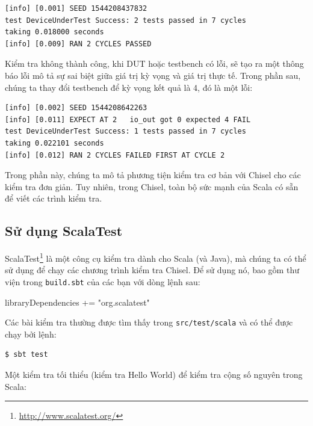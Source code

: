 \documentclass[%
    10pt,
    headinclude, footexclude,
    openright, %
    notitlepage,
    cleardoubleempty,
    headsepline,
    pointlessnumbers,
    bibtotoc, idxtotoc,
    ]{scrbook}
\newcommand{\code}[1]{{\small{\texttt{#1}}}}
\newcommand{\todo}[1]{{\emph{TODO: #1}}}
\newcommand{\myref}[2]{\href{#1}{#2}}
\renewcommand{\myref}[2]{{#2}{\footnote{\url{#1}}}}
\renewcommand{\todo}[1]{}
\begin{document}
\begin{verbatim}
[info] [0.001] SEED 1544208437832
test DeviceUnderTest Success: 2 tests passed in 7 cycles
taking 0.018000 seconds
[info] [0.009] RAN 2 CYCLES PASSED
\end{verbatim}

\noindent Kiểm tra không thành công, khi DUT hoặc testbench có lỗi, sẽ tạo ra một thông báo 
lỗi mô tả sự sai biệt giữa giá trị kỳ vọng và giá trị thực tế. Trong phần sau, chúng ta 
thay đổi testbench để kỳ vọng kết quả là 4, đó là một lỗi:

\begin{verbatim}
[info] [0.002] SEED 1544208642263
[info] [0.011] EXPECT AT 2   io_out got 0 expected 4 FAIL
test DeviceUnderTest Success: 1 tests passed in 7 cycles
taking 0.022101 seconds
[info] [0.012] RAN 2 CYCLES FAILED FIRST AT CYCLE 2
\end{verbatim}

Trong phần này, chúng ta mô tả phương tiện kiểm tra cơ bản với Chisel cho các kiểm tra đơn giản.
Tuy nhiên, trong Chisel, toàn bộ sức mạnh của Scala có sẵn để viết các trình kiểm tra. 
\todo{Có một liên kết đến phần này chưa được viết: Chúng tôi sẽ trình bày sau.}

\subsection{Sử dụng ScalaTest}


\myref{http://www.scalatest.org/}{ScalaTest} là một công cụ kiểm tra dành cho Scala (và Java),
mà chúng ta có thể sử dụng để chạy các chương trình kiểm tra Chisel.
Để sử dụng nó, bao gồm thư viện trong \code{build.sbt} của các bạn với dòng lệnh sau:

\begin{chisel}
libraryDependencies += "org.scalatest" %
\end{chisel}

\noindent Các bài kiểm tra thường được tìm thấy trong \code{src/test/scala} và có thể được chạy bởi lệnh:

\begin{verbatim}
$ sbt test
\end{verbatim}

\noindent Một kiểm tra tối thiểu (kiểm tra Hello World) để kiểm tra cộng số nguyên trong Scala:

\end{document}
